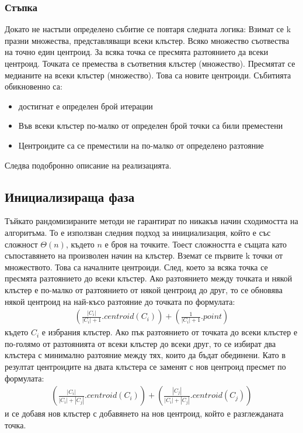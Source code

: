 \documentclass[a4paper, 12pt]{article}
\begin{document}
\subsubsection{Стъпка}
Докато не настъпи определено събитие се повтаря следната логика:
Взимат се k празни множества, представляващи всеки клъстер.
Всяко множество съотвества на точно един центроид.
За всяка точка се пресмята разтоянието да всеки центроид.
Точката се премества в съответния клъстер (множество).
Пресмятат се медианите на всеки клъстер (множество).
Това са новите центроиди. 
Събитията обикновенно са:
\begin{itemize}
\item достигнат е определен брой итерации
\item Във всеки клъстер по-малко от определен брой точки са били преместени
\item Центроидите са се преместили на по-малко от определено разтояние
\end{itemize}


Следва подобронно описание на реализацията.
\subsection{Инициализираща фаза}
Тъйкато рандомизираните методи не гарантират по никакъв начин сходимостта на алгоритъма.
То е използван следния подход за инициализация, който е със сложност \(\Theta(n)\),
където \(n\) е броя на точките. Тоест сложността е същата като съпоставянето на произволен начин на клъстер.
Вземат се първите k точки от множеството. Това са началните центроиди.
След, което за всяка точка се пресмята разтоянието до всеки клъстер.
Ако разтоянието между точката и някой клъстер е по-малко от разтоянието от някой центроид до друг,
то се обновява някой центроид на най-късо разтояние до точката по формулата:
\begin{align}
    \left(\displaystyle\frac{|C_i|}{|C_i| + 1} . centroid(C_i)\right) + \left(\displaystyle\frac{1}{|C_i| + 1} . point\right) \label{updateMean1}
\end{align}
където \(C_i\) е избрания клъстер.
Ако пък разтоянието от точката до всеки клъстер е по-голямо от разтоянията от всеки клъстер до всеки друг,
то се избират два клъстера с минимално разтояние между тях, които да бъдат обединени.
Като в резултат центроидите на двата клъстера се заменят с нов центроид пресмет по формулата:
\begin{align}
    \left(\displaystyle\frac{|C_i|}{|C_i| + |C_j|} . centroid(C_i)\right) + \left(\displaystyle\frac{|C_j|}{|C_i| + |C_j|} . centroid(C_j)\right) \label{updateMean2}
\end{align}
и се добавя нов клъстер с добавянето на нов центроид, който е разглежданата точка.
\end{document}
